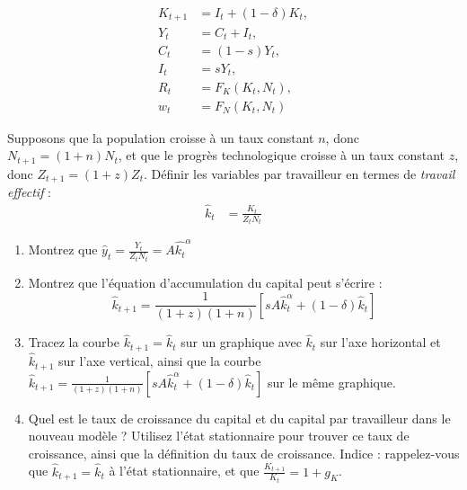 \documentclass[11pt]{article}
\begin{document}
\begin{align*}
    K_{t+1} &= I_t + (1 - \delta)K_t, \\
    Y_t &= C_t + I_t, \\
    C_t &= (1 - s)Y_t, \\
    I_t &= sY_t, \\
    R_t &= F_K(K_t, N_t), \\
    w_t &= F_N(K_t, N_t)
\end{align*}

Supposons que la population croisse à un taux constant \(n\), donc \(N_{t+1} = (1 + n)N_t\),
et que le progrès technologique croisse à un taux constant \(z\), donc \(Z_{t+1} = (1 + z)Z_t\).
Définir les variables par travailleur en termes de \textit{travail effectif} :
\begin{align*}
    \hat{k}_t   &= \frac{K_t}{Z_tN_t}
\end{align*}

\begin{enumerate}
    \item Montrez que \( \hat{y}_t = \frac{Y_t}{Z_tN_t} = A\hat{k_t}^\alpha\)
    \item Montrez que l'équation d'accumulation du capital peut s'écrire :
    \[\hat{k}_{t+1} = \frac{1}{(1+z)(1+n)}[sA\hat{k}_t^\alpha + (1 - \delta)\hat{k}_t]\]
    \item Tracez la courbe \(\hat{k}_{t+1} = \hat{k}_t\) sur un graphique avec \(\hat{k}_t\) sur l'axe horizontal et \(\hat{k}_{t+1}\) sur l'axe vertical,
    ainsi que la courbe \(\hat{k}_{t+1} = \frac{1}{(1+z)(1+n)}[sA\hat{k}_t^\alpha + (1 - \delta)\hat{k}_t] \) sur le même graphique.
    \item Quel est le taux de croissance du capital et du capital par travailleur 
    dans le nouveau modèle ? 
    Utilisez l'état stationnaire pour trouver ce taux de croissance, ainsi que la définition du taux de croissance.
    Indice : rappelez-vous que \(\hat{k}_{t+1} = \hat{k}_t\) à l'état stationnaire, 
    et que \(\frac{K_{t+1}}{K_t} = 1 + g_K\).
\end{enumerate}
\end{document}
